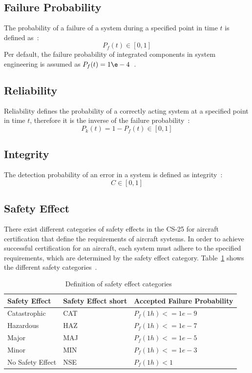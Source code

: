 \subsection{Failure Probability}\label{subsec:failure-probability}
The probability of a failure of a system during a specified point in time $t$ is defined as~\cite{lfs2}:
\begin{equation}
    \label{eq:failure-probability}
    P_f(t) \in [0,1]
\end{equation}
Per default, the failure probability of integrated components in system engineering is assumed as $P_f(t) = 1\e-4$~\cite{lfs2}.
\subsection{Reliability}\label{subsec:reliability}
Reliability defines the probability of a correctly acting system at a specified point in time $t$,
therefore it is the inverse of the failure probability~\cite{lfs2}:
\begin{equation}
    \label{eq:reliability}
    P_k(t) = 1 - P_f(t) \in [0,1]
\end{equation}
\subsection{Integrity}\label{subsec:integrity}
The detection probability of an error in a system is defined as integrity~\cite{lfs2}:
\begin{equation}
    \label{eq:integrity}
    C \in [0,1]
\end{equation}
\subsection{Safety Effect}\label{subsec:safety-effect}
There exist different categories of safety effects in the CS-25 for aircraft certification that define the requirements of aircraft systems.
In order to achieve successful certification for an aircraft, each system must adhere to the specified requirements, which are determined by the safety effect category.
Table~\ref{tab:safety-effect} shows the different safety categories~\cite{cs25}.
\begin{table}[!htb]
    \centering
    \begin{tabular}{l|l|l}
        Safety Effect    & Safety Effect short & Accepted Failure Probability \\ \hline
        Catastrophic     & CAT                 & $P_f(1h) <= 1e-9$           \\
        Hazardous        & HAZ                 & $P_f(1h) <= 1e-7$           \\
        Major            & MAJ                 & $P_f(1h) <= 1e-5$           \\
        Minor            & MIN                 & $P_f(1h) <= 1e-3$           \\
        No Safety Effect & NSE                 & $P_f(1h) < 1$
    \end{tabular}
    \caption{Definition of safety effect categories~\cite{lfs1,cs25}}
    \label{tab:safety-effect}
\end{table}
